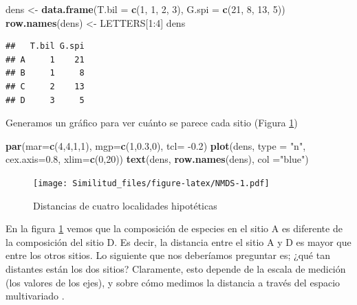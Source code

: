 \documentclass[]{book}
\newenvironment{Shaded}{\begin{snugshade}}{\end{snugshade}}
\newcommand{\KeywordTok}[1]{\textcolor[rgb]{0.13,0.29,0.53}{\textbf{{#1}}}}
\newcommand{\DataTypeTok}[1]{\textcolor[rgb]{0.13,0.29,0.53}{{#1}}}
\newcommand{\DecValTok}[1]{\textcolor[rgb]{0.00,0.00,0.81}{{#1}}}
\newcommand{\FloatTok}[1]{\textcolor[rgb]{0.00,0.00,0.81}{{#1}}}
\newcommand{\StringTok}[1]{\textcolor[rgb]{0.31,0.60,0.02}{{#1}}}
\newcommand{\NormalTok}[1]{{#1}}
\begin{document}
\begin{Shaded}
\begin{Highlighting}[]
\NormalTok{dens <-}\StringTok{ }\KeywordTok{data.frame}\NormalTok{(}\DataTypeTok{T.bil =} \KeywordTok{c}\NormalTok{(}\DecValTok{1}\NormalTok{, }\DecValTok{1}\NormalTok{, }\DecValTok{2}\NormalTok{, }\DecValTok{3}\NormalTok{), }\DataTypeTok{G.spi =} \KeywordTok{c}\NormalTok{(}\DecValTok{21}\NormalTok{, }\DecValTok{8}\NormalTok{, }\DecValTok{13}\NormalTok{, }\DecValTok{5}\NormalTok{)) }
\KeywordTok{row.names}\NormalTok{(dens) <-}\StringTok{ }\NormalTok{LETTERS[}\DecValTok{1}\NormalTok{:}\DecValTok{4}\NormalTok{]}
\NormalTok{dens}
\end{Highlighting}
\end{Shaded}

\begin{verbatim}
##   T.bil G.spi
## A     1    21
## B     1     8
## C     2    13
## D     3     5
\end{verbatim}

Generamos un gráfico para ver cuánto se parece cada sitio (Figura
\ref{fig:NMDS})

\begin{Shaded}
\begin{Highlighting}[]
\KeywordTok{par}\NormalTok{(}\DataTypeTok{mar=}\KeywordTok{c}\NormalTok{(}\DecValTok{4}\NormalTok{,}\DecValTok{4}\NormalTok{,}\DecValTok{1}\NormalTok{,}\DecValTok{1}\NormalTok{), }\DataTypeTok{mgp=}\KeywordTok{c}\NormalTok{(}\DecValTok{1}\NormalTok{,}\FloatTok{0.3}\NormalTok{,}\DecValTok{0}\NormalTok{), }\DataTypeTok{tcl=} \NormalTok{-}\FloatTok{0.2}\NormalTok{)}
\KeywordTok{plot}\NormalTok{(dens, }\DataTypeTok{type =} \StringTok{"n"}\NormalTok{, }\DataTypeTok{cex.axis=}\FloatTok{0.8}\NormalTok{, }\DataTypeTok{xlim=}\KeywordTok{c}\NormalTok{(}\DecValTok{0}\NormalTok{,}\DecValTok{20}\NormalTok{)) }
\KeywordTok{text}\NormalTok{(dens, }\KeywordTok{row.names}\NormalTok{(dens), }\DataTypeTok{col =}\StringTok{"blue"}\NormalTok{)}
\end{Highlighting}
\end{Shaded}

\begin{figure}[htbp]
\centering
\texttt{[image: Similitud\_files/figure-latex/NMDS-1.pdf]}
\caption{\label{fig:NMDS}Distancias de cuatro localidades hipotéticas}
\end{figure}

En la figura \ref{fig:NMDS} vemos que la composición de especies en el
sitio A es diferente de la composición del sitio D. Es decir, la
distancia entre el sitio A y D es mayor que entre los otros sitios. Lo
siguiente que nos deberíamos preguntar es; ¿qué tan distantes están los
dos sitios? Claramente, esto depende de la escala de medición (los
valores de los ejes), y sobre cómo medimos la distancia a través del
espacio multivariado \citep{Stevens2009}.
\end{document}
